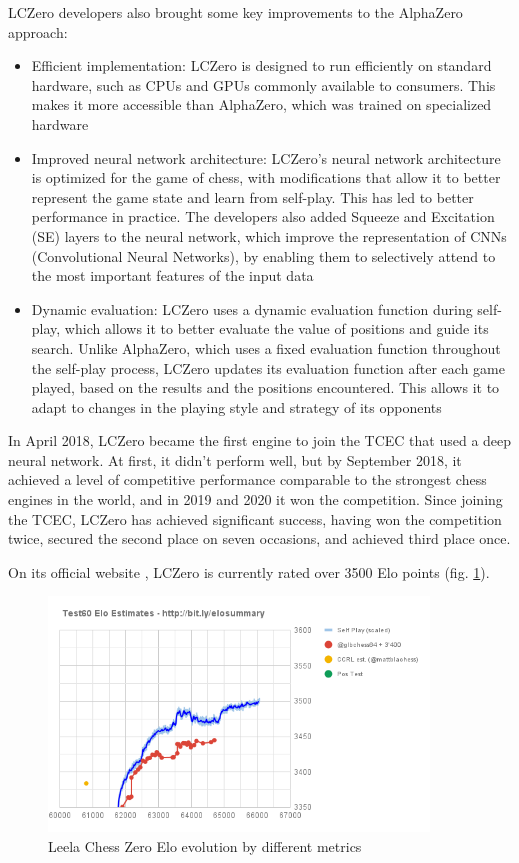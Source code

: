 LCZero developers also brought some key improvements to the AlphaZero approach:
\begin{itemize}
    \item Efficient implementation: LCZero is designed to run efficiently on standard hardware, such as CPUs and GPUs commonly available to consumers. This makes it more accessible than AlphaZero, which was trained on specialized hardware
    \item Improved neural network architecture: LCZero's neural network architecture is optimized for the game of chess, with modifications that allow it to better represent the game state and learn from self-play. This has led to better performance in practice. The developers also added Squeeze and Excitation (SE) layers to the neural network, which improve the representation of CNNs (Convolutional Neural Networks), by enabling them to selectively attend to the most important features of the input data
    \item Dynamic evaluation: LCZero uses a dynamic evaluation function during self-play, which allows it to better evaluate the value of positions and guide its search. Unlike AlphaZero, which uses a fixed evaluation function throughout the self-play process, LCZero updates its evaluation function after each game played, based on the results and the positions encountered. This allows it to adapt to changes in the playing style and strategy of its opponents
\end{itemize}

In April 2018, LCZero became the first engine to join the TCEC that used a deep neural network. At first, it didn't perform well, but by September 2018, it achieved a level of competitive performance comparable to the strongest chess engines in the world, and in 2019 and 2020 it won the competition. Since joining the TCEC, LCZero has achieved significant success, having won the competition twice, secured the second place on seven occasions, and achieved third place once.

On its official website \cite{lczero-training}, LCZero is currently rated over 3500 Elo points (fig. \ref{fig:leelaChessZeroEloEvolution}).

\begin{figure}[h]
    \centering
    \includegraphics[width=0.9\textwidth]{figures/leela-chess-zero-elo-evolution.png}
    \caption{Leela Chess Zero Elo evolution by different metrics \cite{lczero-training}}
    \label{fig:leelaChessZeroEloEvolution}
\end{figure}